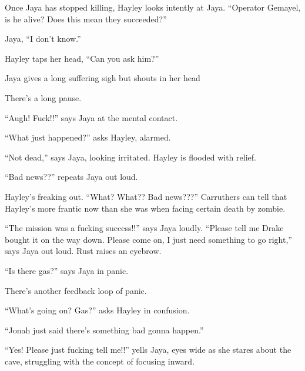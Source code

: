 
Once Jaya has stopped killing, Hayley looks intently at Jaya. ``Operator Gemayel, is he alive? Does this mean they succeeded?''

Jaya, ``I don't know.''

Hayley taps her head, ``Can you ask him?''

Jaya gives a long suffering sigh but shouts in her head   

There's a long pause.  


``Augh!  Fuck!!'' says Jaya at the mental contact.

``What just happened?'' asks Hayley, alarmed.

``Not dead,'' says Jaya, looking irritated.  Hayley is flooded with relief.


``Bad news??'' repeats Jaya out loud.

Hayley's freaking out.  ``What?  What??  Bad news???''  Carruthers can tell that Hayley's more frantic now than she was when facing certain death by zombie.


``The mission was a fucking success!!'' says Jaya loudly.  ``Please tell me Drake bought it on the way down.  Please come on, I just need something to go right,'' says Jaya out loud.  Rust raises an eyebrow.


``Is there gas?'' says Jaya in panic.


There's another feedback loop of panic.

``What's going on?  Gas?'' asks Hayley in confusion.

``Jonah just said there's something bad gonna happen.''


``Yes!  Please just fucking tell me!!'' yells Jaya, eyes wide as she stares about the cave, struggling with the concept of focusing inward.

